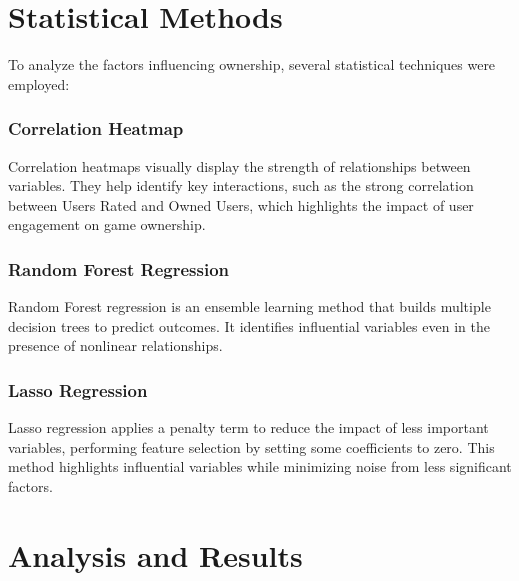 \documentclass{article}
\begin{document}
\section{Statistical Methods}
To analyze the factors influencing ownership, several statistical techniques were employed:

\subsubsection*{Correlation Heatmap}
Correlation heatmaps visually display the strength of relationships between variables. They help identify key interactions, such as the strong correlation between Users Rated and Owned Users, which highlights the impact of user engagement on game ownership.

\subsubsection*{Random Forest Regression}
Random Forest regression is an ensemble learning method that builds multiple decision trees to predict outcomes. It identifies influential variables even in the presence of nonlinear relationships.

\subsubsection*{Lasso Regression}
Lasso regression applies a penalty term to reduce the impact of less important variables, performing feature selection by setting some coefficients to zero. This method highlights influential variables while minimizing noise from less significant factors.

\section{Analysis and Results}
\end{document}
